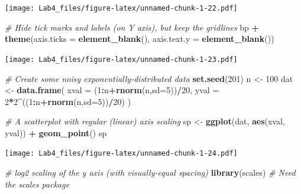 \documentclass[]{article}
\newenvironment{Shaded}{\begin{snugshade}}{\end{snugshade}}
\newcommand{\KeywordTok}[1]{\textcolor[rgb]{0.13,0.29,0.53}{\textbf{#1}}}
\newcommand{\DataTypeTok}[1]{\textcolor[rgb]{0.13,0.29,0.53}{#1}}
\newcommand{\DecValTok}[1]{\textcolor[rgb]{0.00,0.00,0.81}{#1}}
\newcommand{\StringTok}[1]{\textcolor[rgb]{0.31,0.60,0.02}{#1}}
\newcommand{\CommentTok}[1]{\textcolor[rgb]{0.56,0.35,0.01}{\textit{#1}}}
\newcommand{\OperatorTok}[1]{\textcolor[rgb]{0.81,0.36,0.00}{\textbf{#1}}}
\newcommand{\NormalTok}[1]{#1}
\begin{document}
\texttt{[image: Lab4\_files/figure-latex/unnamed-chunk-1-22.pdf]}

\begin{Shaded}
\begin{Highlighting}[]
\CommentTok{# Hide tick marks and labels (on Y axis), but keep the gridlines}
\NormalTok{bp }\OperatorTok{+}\StringTok{ }\KeywordTok{theme}\NormalTok{(}\DataTypeTok{axis.ticks =} \KeywordTok{element_blank}\NormalTok{(), }\DataTypeTok{axis.text.y =} \KeywordTok{element_blank}\NormalTok{())}
\end{Highlighting}
\end{Shaded}

\texttt{[image: Lab4\_files/figure-latex/unnamed-chunk-1-23.pdf]}

\begin{Shaded}
\begin{Highlighting}[]
\CommentTok{# Create some noisy exponentially-distributed data}
\KeywordTok{set.seed}\NormalTok{(}\DecValTok{201}\NormalTok{)}
\NormalTok{n <-}\StringTok{ }\DecValTok{100}
\NormalTok{dat <-}\StringTok{ }\KeywordTok{data.frame}\NormalTok{(}
    \DataTypeTok{xval =}\NormalTok{ (}\DecValTok{1}\OperatorTok{:}\NormalTok{n}\OperatorTok{+}\KeywordTok{rnorm}\NormalTok{(n,}\DataTypeTok{sd=}\DecValTok{5}\NormalTok{))}\OperatorTok{/}\DecValTok{20}\NormalTok{,}
    \DataTypeTok{yval =} \DecValTok{2}\OperatorTok{*}\DecValTok{2}\OperatorTok{^}\NormalTok{((}\DecValTok{1}\OperatorTok{:}\NormalTok{n}\OperatorTok{+}\KeywordTok{rnorm}\NormalTok{(n,}\DataTypeTok{sd=}\DecValTok{5}\NormalTok{))}\OperatorTok{/}\DecValTok{20}\NormalTok{)}
\NormalTok{)}

\CommentTok{# A scatterplot with regular (linear) axis scaling}
\NormalTok{sp <-}\StringTok{ }\KeywordTok{ggplot}\NormalTok{(dat, }\KeywordTok{aes}\NormalTok{(xval, yval)) }\OperatorTok{+}\StringTok{ }\KeywordTok{geom_point}\NormalTok{()}
\NormalTok{sp}
\end{Highlighting}
\end{Shaded}

\texttt{[image: Lab4\_files/figure-latex/unnamed-chunk-1-24.pdf]}

\begin{Shaded}
\begin{Highlighting}[]
\CommentTok{# log2 scaling of the y axis (with visually-equal spacing)}
\KeywordTok{library}\NormalTok{(scales)     }\CommentTok{# Need the scales package}
\end{Highlighting}
\end{Shaded}
\end{document}
